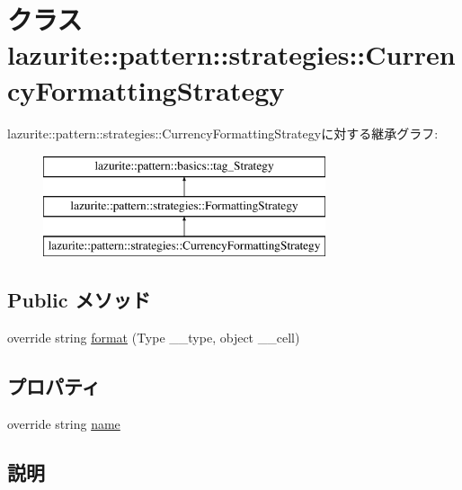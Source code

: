 \hypertarget{classlazurite_1_1pattern_1_1strategies_1_1_currency_formatting_strategy}{
\section{クラス lazurite::pattern::strategies::CurrencyFormattingStrategy}
\label{classlazurite_1_1pattern_1_1strategies_1_1_currency_formatting_strategy}
}
lazurite::pattern::strategies::CurrencyFormattingStrategyに対する継承グラフ:\begin{figure}[H]
\begin{center}
\leavevmode
\includegraphics[height=3cm]{classlazurite_1_1pattern_1_1strategies_1_1_currency_formatting_strategy}
\end{center}
\end{figure}
\subsection*{Public メソッド}
\begin{DoxyCompactItemize}
\item 
override string \hyperlink{classlazurite_1_1pattern_1_1strategies_1_1_currency_formatting_strategy_a72ff3e13e9da631c30822649a7ccea43}{format} (Type \_\-\_\-type, object \_\-\_\-cell)
\end{DoxyCompactItemize}
\subsection*{プロパティ}
\begin{DoxyCompactItemize}
\item 
override string \hyperlink{classlazurite_1_1pattern_1_1strategies_1_1_currency_formatting_strategy_a507841259b13c733d09c2f747e81b8d5}{name}
\end{DoxyCompactItemize}


\subsection{説明}


